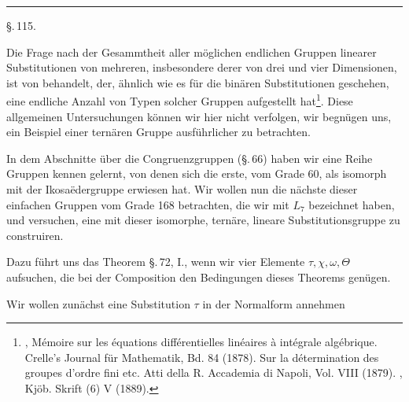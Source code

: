 
\begin{center}


\rule{0.3\linewidth}{0.4pt}

\S.\,115.

\end{center}

Die Frage nach der Gesammtheit aller möglichen endlichen
Gruppen linearer Substitutionen von mehreren, insbesondere
derer von drei und vier Dimensionen, ist von  behandelt,
der, ähnlich wie es für die binären Substitutionen geschehen,
eine endliche Anzahl von Typen solcher Gruppen aufgestellt hat\footnote{, Mémoire sur les équations différentielles linéaires à
intégrale algébrique. Crelle's Journal für Mathematik, Bd. 84 (1878). Sur
la détermination des groupes d'ordre fini etc. Atti della R. Accademia di
Napoli, Vol. VIII (1879). , Kj\"ob. Skrift (6) V (1889).}. Diese allgemeinen Untersuchungen können wir
hier nicht verfolgen, wir begnügen uns, ein Beispiel einer ternären
Gruppe ausführlicher zu betrachten.

In dem Abschnitte über die Congruenzgruppen (\S.\,66) haben
wir eine Reihe  Gruppen kennen gelernt, von denen
sich die erste, vom Grade 60, als isomorph mit der Ikosaëdergruppe
erwiesen hat. Wir wollen nun die nächste dieser einfachen
Gruppen vom Grade 168 betrachten, die wir mit $L_7$ bezeichnet
haben, und versuchen, eine mit dieser isomorphe, ternäre, lineare
Substitutionsgruppe zu construiren.

Dazu führt uns das Theorem \S.\,72, I., wenn wir vier Elemente
$\tau, \chi, \omega, \Theta$ aufsuchen, die bei der Composition den Bedingungen
dieses Theorems genügen.

Wir wollen zunächst eine Substitution $\tau$ in der Normalform
annehmen
